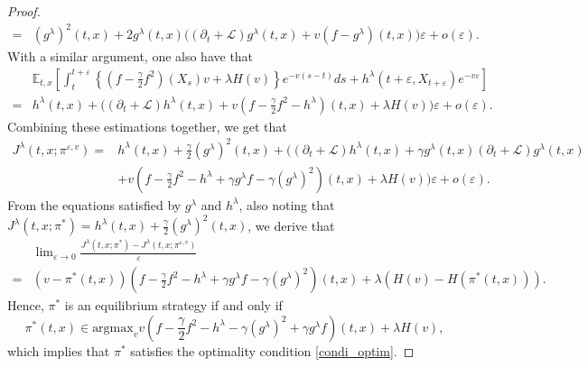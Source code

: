 \documentclass[11pt]{article}
\begin{document}
\begin{proof}
\begin{equation*}
\begin{split}
  =&(g^\lambda)^2(t,x)+2 g^\lambda(t,x)\bigg((\partial_t+\mathcal L) g^\lambda(t,x)+v(f-g^\lambda)(t,x)\bigg)\varepsilon+o(\varepsilon).
  \end{split}
\end{equation*}
With a similar argument, one also have that 
\begin{equation*}
\begin{split}
&\mathbb E_{t,x}\left[\int_t^{t+\varepsilon} \left\{(f-\frac{\gamma}{2}f^2)(X_s)v+\lambda H(v)\right\}e^{-v(s-t)} ds+h^\lambda(t+\varepsilon,X_{t+\varepsilon})e^{-v \varepsilon}\right]\\
=&h^\lambda(t,x)+\bigg((\partial_t +\mathcal L) h^\lambda(t,x)+v(f-\frac{\gamma}{2}f^2-h^\lambda)(t,x)+\lambda H(v)\bigg)\varepsilon +o(\varepsilon).
\end{split}
\end{equation*}
Combining these estimations together, we get that
\begin{equation*}
 \begin{split}
J^\lambda(t,x;\pi^{\varepsilon,v})=&h^\lambda(t,x)+\frac\gamma2(g^\lambda)^2(t,x)+\bigg(
(\partial_t+\mathcal L)h^\lambda(t,x)+\gamma g^\lambda(t,x)(\partial_t+\mathcal L)g^\lambda(t,x)\\
&+v(f-\frac\gamma2 f^2-h^\lambda+\gamma g^\lambda f-\gamma (g^\lambda)^2)(t,x)+\lambda H(v) 
\bigg)\varepsilon+o(\varepsilon).
 \end{split}   
\end{equation*}
From the equations satisfied by $g^\lambda$ and $h^\lambda$, also noting that $J^\lambda(t,x;\pi^*)=h^\lambda(t,x)+\frac\gamma2(g^\lambda)^2(t,x)$, we derive that
\begin{equation*}
\begin{split}
&\mathop{\text{lim}}_{\varepsilon \rightarrow 0} \frac{J^{\lambda}(t,x;\pi^*)-J^{\lambda}(t,x;\pi^{\varepsilon,v})}{\varepsilon}\\
=&(v-\pi^*(t,x))(f-\frac\gamma2 f^2-h^\lambda+\gamma g^\lambda f-\gamma (g^\lambda)^2)(t,x)+\lambda(H(v)-H(\pi^*(t,x))).
\end{split}
\end{equation*}
Hence, $\pi^*$ is an equilibrium strategy if and only if
$$
\pi^*(t,x) \in \text{argmax}_{v} v(f-\frac{\gamma}{2}f^2-h^\lambda-\gamma (g^\lambda)^2+\gamma g^\lambda f)(t,x)+\lambda H(v),
$$
which implies that $\pi^*$ satisfies the optimality condition \eqref{condi_optim}.
\end{proof}
\end{document}
